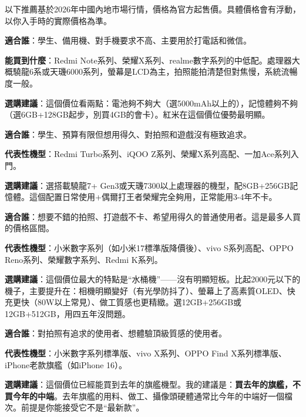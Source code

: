 
以下推薦基於2026年中國內地市場行情，價格為官方起售價。具體價格會有浮動，以你入手時的實際價格為準。


\textbf{適合誰}：學生、備用機、對手機要求不高、主要用於打電話和微信。

\textbf{能買到什麼}：Redmi Note系列、榮耀X系列、realme數字系列的中低配。處理器大概驍龍6系或天璣6000系列，螢幕是LCD為主，拍照能拍清楚但對焦慢，系統流暢度一般。

\textbf{選購建議}：這個價位看兩點：電池夠不夠大（選5000mAh以上的），記憶體夠不夠（選6GB+128GB起步，別買4GB的會卡）。紅米在這個價位優勢最明顯。


\textbf{適合誰}：學生、預算有限但想用得久、對拍照和遊戲沒有極致追求。

\textbf{代表性機型}：Redmi Turbo系列、iQOO Z系列、榮耀X系列高配、一加Ace系列入門。

\textbf{選購建議}：選搭載驍龍7+ Gen3或天璣7300以上處理器的機型，配8GB+256GB記憶體。這個配置日常使用+偶爾打王者榮耀完全夠用，正常能用3-4年不卡。


\textbf{適合誰}：想要不錯的拍照、打遊戲不卡、希望用得久的普通使用者。這是最多人買的價格區間。

\textbf{代表性機型}：小米數字系列（如小米17標準版降價後）、vivo S系列高配、OPPO Reno系列、榮耀數字系列、Redmi K系列。

\textbf{選購建議}：這個價位最大的特點是“水桶機”——沒有明顯短板。比起2000元以下的機子，主要提升在：相機明顯變好（有光學防抖了）、螢幕上了高素質OLED、快充更快（80W以上常見）、做工質感也更精緻。選12GB+256GB或12GB+512GB，用四五年沒問題。


\textbf{適合誰}：對拍照有追求的使用者、想體驗頂級質感的使用者。

\textbf{代表性機型}：小米數字系列標準版、vivo X系列、OPPO Find X系列標準版、iPhone老款旗艦（如iPhone 16）。

\textbf{選購建議}：這個價位已經能買到去年的旗艦機型。我的建議是：\textbf{買去年的旗艦，不買今年的中端}。去年旗艦的用料、做工、攝像頭硬體通常比今年的中端好一個檔次。前提是你能接受它不是“最新款”。

